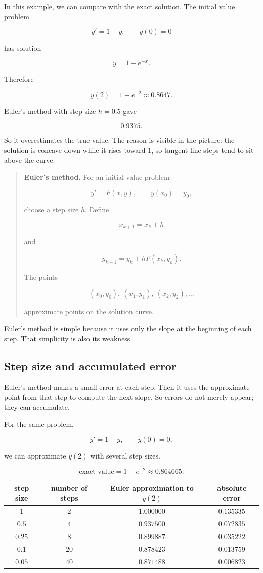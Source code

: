 In this example, we can compare with the exact solution.  The initial value problem

\[
y'=1-y,
\qquad
y(0)=0
\]

has solution

\[
y=1-e^{-x}.
\]

Therefore

\[
y(2)=1-e^{-2}\approx0.8647.
\]

Euler's method with step size \(h=0.5\) gave

\[
0.9375.
\]

So it overestimates the true value.  The reason is visible in the picture: the solution is
concave down while it rises toward \(1\), so tangent-line steps tend to sit above the
curve.

\begin{quote}
\textbf{Euler's method.}
For an initial value problem

\[
y'=F(x,y),
\qquad
y(x_0)=y_0,
\]

choose a step size \(h\).  Define

\[
x_{k+1}=x_k+h
\]

and

\[
\boxed{
y_{k+1}=y_k+hF(x_k,y_k).
}
\]

The points

\[
(x_0,y_0),\ (x_1,y_1),\ (x_2,y_2),\ldots
\]

approximate points on the solution curve.
\end{quote}

Euler's method is simple because it uses only the slope at the beginning of each step.
That simplicity is also its weakness.

\subsection{Step size and accumulated error}
\label{subsec:step-size-accumulated-error}

Euler's method makes a small error at each step.  Then it uses the approximate point
from that step to compute the next slope.  So errors do not merely appear; they can
accumulate.

For the same problem,

\[
y'=1-y,
\qquad
y(0)=0,
\]

we can approximate \(y(2)\) with several step sizes.

\[
\text{exact value}=1-e^{-2}\approx0.864665.
\]

\begin{center}
\begin{tabular}{c|c|c|c}
\textbf{step size} & \textbf{number of steps} & \textbf{Euler approximation to \(y(2)\)} & \textbf{absolute error} \\ \hline
\(1\) & \(2\) & \(1.000000\) & \(0.135335\) \\
\(0.5\) & \(4\) & \(0.937500\) & \(0.072835\) \\
\(0.25\) & \(8\) & \(0.899887\) & \(0.035222\) \\
\(0.1\) & \(20\) & \(0.878423\) & \(0.013759\) \\
\(0.05\) & \(40\) & \(0.871488\) & \(0.006823\)
\end{tabular}
\end{center}

